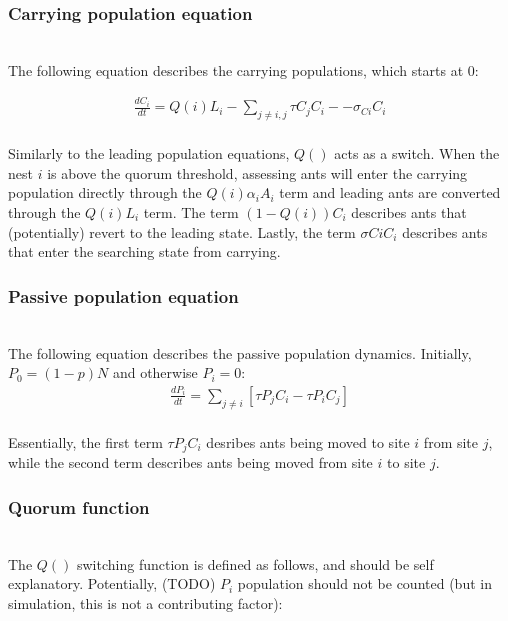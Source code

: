 \documentclass[letterpaper]{article}
\begin{document}
\subsubsection{Carrying population equation}
\hfill\\

The following equation describes the carrying populations, which starts at $0$:

\begin{multline}
        \frac{dC_i}{dt} = Q(i)L_i - \sum_{j \neq i, j} \tau C_jC_i - - \sigma_{Ci}C_i \\
\end{multline}

Similarly to the leading population equations, $Q()$ acts as a switch. When the nest $i$ is above the quorum threshold, assessing ants will enter the carrying population directly through the $Q(i)\alpha_iA_i$ term and leading ants are converted through the $Q(i)L_i$ term.
The term $(1-Q(i))C_i$ describes ants that (potentially) revert to the leading state. 
Lastly, the term $\sigma{Ci}C_i$ describes ants that enter the searching state from carrying.

\subsubsection{Passive population equation}
\hfill\\

The following equation describes the passive population dynamics. Initially, $P_0 = (1-p)N$ and otherwise $P_i = 0$:
\begin{equation}
\begin{aligned}
        \frac{dP_i}{dt} = \sum_{j \neq i} [\tau P_j C_i - \tau P_i C_j] \\
\end{aligned}
\end{equation}

Essentially, the first term $\tau P_jC_i$ desribes ants being moved to site $i$ from site $j$, while the second term describes ants being moved from site $i$ to site $j$.

\subsubsection{Quorum function}
\hfill\\

The $Q()$ switching function is defined as follows, and should be self explanatory. Potentially, (TODO) $P_i$ population should not be counted (but in simulation, this is not a contributing factor):
\end{document}
